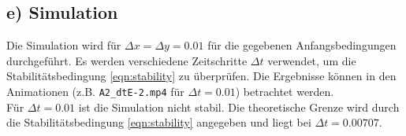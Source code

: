 \subsection{e) Simulation}
Die Simulation wird für $\Delta x = \Delta y = 0.01$ für die gegebenen Anfangsbedingungen durchgeführt.
Es werden verschiedene Zeitschritte $\Delta t$ verwendet, um die Stabilitätsbedingung \autoref{eqn:stability} zu überprüfen.
Die Ergebnisse können in den Animationen (z.B. \texttt{A2\_dtE-2.mp4} für $\Delta t = 0.01$) betrachtet werden.
\\
Für $\Delta t = 0.01$ ist die Simulation nicht stabil.
Die theoretische Grenze wird durch die Stabilitätsbedingung \autoref{eqn:stability} angegeben und liegt bei $\Delta t = 0.00707$.